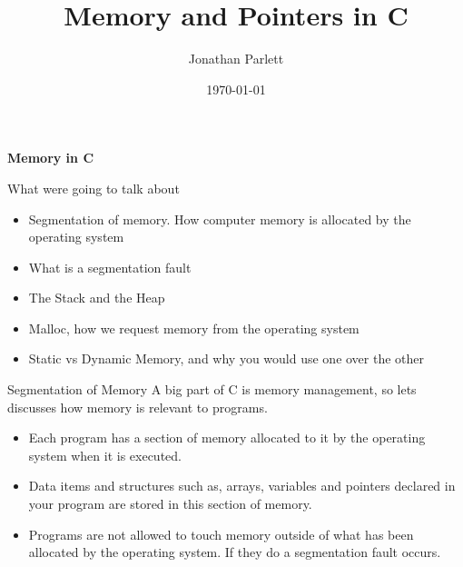 \documentclass{beamer}
\title{Memory and Pointers in C}
\author{Jonathan Parlett}
\date{\today}
\begin{document}
\begin{frame}
    \titlepage
	{\bf Memory in C}
\end{frame}

\begin{frame}{What were going to talk about}
	\begin{itemize}[<+->]
		\item Segmentation of memory. How computer memory is allocated by the operating system
		\item What is a segmentation fault
		\item The Stack and the Heap
		\item Malloc, how we request memory from the operating system
		\item Static vs Dynamic Memory, and why you would use one over the other
	\end{itemize}
\end{frame}


\begin{frame}{Segmentation of Memory}
	A big part of C is memory management, so lets discusses how memory is relevant to programs.

	\begin{itemize}[<+->]
		\item Each program has a section of memory allocated to it by the operating system when it is executed. 
		\item Data items and structures such as, arrays, variables and pointers declared in your program are stored in this section of memory.
		\item Programs are not allowed to touch memory outside of what has been allocated by the operating system. If they do a segmentation fault occurs.
	\end{itemize}
\end{frame}
\end{document}
